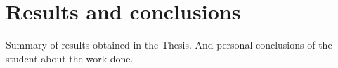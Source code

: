 \chapter{Results and conclusions}

Summary of results obtained in the Thesis. And personal conclusions of the student about the work done.
